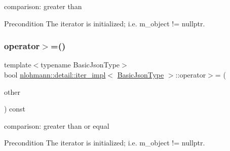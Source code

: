 comparison\+: greater than 

\begin{DoxyPrecond}{Precondition}
The iterator is initialized; i.\+e. {\ttfamily m\+\_\+object != nullptr}. 
\end{DoxyPrecond}
\mbox{\label{classnlohmann_1_1detail_1_1iter__impl_a634f85da575cb60b012a687efa26e11a}} 
\subsubsection{\texorpdfstring{operator$>$=()}{operator>=()}}
{\footnotesize\ttfamily template$<$typename Basic\+Json\+Type$>$ \\
bool \hyperlink{classnlohmann_1_1detail_1_1iter__impl}{nlohmann\+::detail\+::iter\+\_\+impl}$<$ \hyperlink{classnlohmann_1_1detail_1_1iter__impl_abf18f18793f84b0222aebb5a2a87da7a}{Basic\+Json\+Type} $>$\+::operator$>$= (\begin{DoxyParamCaption}\item[{const \hyperlink{classnlohmann_1_1detail_1_1iter__impl}{iter\+\_\+impl}$<$ \hyperlink{classnlohmann_1_1detail_1_1iter__impl_abf18f18793f84b0222aebb5a2a87da7a}{Basic\+Json\+Type} $>$ \&}]{other }\end{DoxyParamCaption}) const\hspace{0.3cm}{\ttfamily [inline]}}



comparison\+: greater than or equal 

\begin{DoxyPrecond}{Precondition}
The iterator is initialized; i.\+e. {\ttfamily m\+\_\+object != nullptr}. 
\end{DoxyPrecond}
\mbox{\label{classnlohmann_1_1detail_1_1iter__impl_ac0b9276f1102ed4b9cd3f5f56287e3ce}} 
